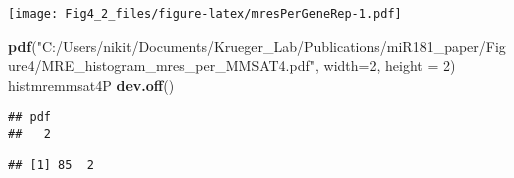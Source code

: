 \documentclass[
]{article}
\newenvironment{Shaded}{\begin{snugshade}}{\end{snugshade}}
\newcommand{\AttributeTok}[1]{\textcolor[rgb]{0.13,0.29,0.53}{#1}}
\newcommand{\DecValTok}[1]{\textcolor[rgb]{0.00,0.00,0.81}{#1}}
\newcommand{\FunctionTok}[1]{\textcolor[rgb]{0.13,0.29,0.53}{\textbf{#1}}}
\newcommand{\NormalTok}[1]{#1}
\newcommand{\OtherTok}[1]{\textcolor[rgb]{0.56,0.35,0.01}{#1}}
\newcommand{\SpecialCharTok}[1]{\textcolor[rgb]{0.81,0.36,0.00}{\textbf{#1}}}
\newcommand{\StringTok}[1]{\textcolor[rgb]{0.31,0.60,0.02}{#1}}
\begin{document}
\texttt{[image: Fig4\_2\_files/figure-latex/mresPerGeneRep-1.pdf]}

\begin{Shaded}
\begin{Highlighting}[]
\FunctionTok{pdf}\NormalTok{(}\StringTok{"C:/Users/nikit/Documents/Krueger\_Lab/Publications/miR181\_paper/Figure4/MRE\_histogram\_mres\_per\_MMSAT4.pdf"}\NormalTok{, }\AttributeTok{width=}\DecValTok{2}\NormalTok{, }\AttributeTok{height =} \DecValTok{2}\NormalTok{)}
\NormalTok{histmremmsat4P}
\FunctionTok{dev.off}\NormalTok{()}
\end{Highlighting}
\end{Shaded}

\begin{verbatim}
## pdf 
##   2
\end{verbatim}

\begin{Shaded}
\end{Shaded}

\begin{verbatim}
## [1] 85  2
\end{verbatim}
\end{document}
